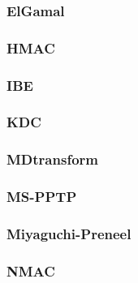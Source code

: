 \begin{frame} \frametitle{ElGamal}
\begin{figure}
\begin{center}

\end{center}
\end{figure}
\end{frame}
\begin{frame} \frametitle{HMAC}
\begin{figure}
\begin{center}

\end{center}
\end{figure}
\end{frame}
\begin{frame} \frametitle{IBE}
\begin{figure}
\begin{center}

\end{center}
\end{figure}
\end{frame}
\begin{frame} \frametitle{KDC}
\begin{figure}
\begin{center}

\end{center}
\end{figure}
\end{frame}
\begin{frame} \frametitle{MDtransform}
\begin{figure}
\begin{center}

\end{center}
\end{figure}
\end{frame}
\begin{frame} \frametitle{MS-PPTP}
\begin{figure}
\begin{center}

\end{center}
\end{figure}
\end{frame}
\begin{frame} \frametitle{Miyaguchi-Preneel}
\begin{figure}
\begin{center}

\end{center}
\end{figure}
\end{frame}
\begin{frame} \frametitle{NMAC}
\begin{figure}
\begin{center}

\end{center}
\end{figure}
\end{frame}

